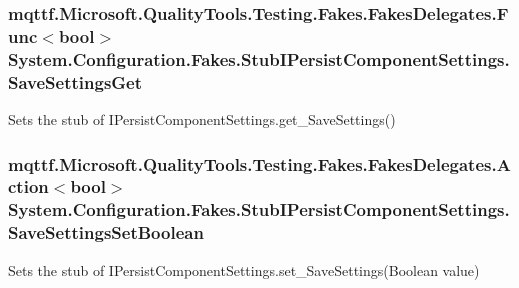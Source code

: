 \hypertarget{class_system_1_1_configuration_1_1_fakes_1_1_stub_i_persist_component_settings_ac9802a6e8e7aad73602ae13f17f6b5df}{
\subsubsection[{Save\-Settings\-Get}]{\setlength{\rightskip}{0pt plus 5cm}mqttf.\-Microsoft.\-Quality\-Tools.\-Testing.\-Fakes.\-Fakes\-Delegates.\-Func$<$bool$>$ System.\-Configuration.\-Fakes.\-Stub\-I\-Persist\-Component\-Settings.\-Save\-Settings\-Get}}\label{class_system_1_1_configuration_1_1_fakes_1_1_stub_i_persist_component_settings_ac9802a6e8e7aad73602ae13f17f6b5df}


Sets the stub of I\-Persist\-Component\-Settings.\-get\-\_\-\-Save\-Settings()

\hypertarget{class_system_1_1_configuration_1_1_fakes_1_1_stub_i_persist_component_settings_a88630acc7f683cd95c66b6fe9c04c1b9}{
\subsubsection[{Save\-Settings\-Set\-Boolean}]{\setlength{\rightskip}{0pt plus 5cm}mqttf.\-Microsoft.\-Quality\-Tools.\-Testing.\-Fakes.\-Fakes\-Delegates.\-Action$<$bool$>$ System.\-Configuration.\-Fakes.\-Stub\-I\-Persist\-Component\-Settings.\-Save\-Settings\-Set\-Boolean}}\label{class_system_1_1_configuration_1_1_fakes_1_1_stub_i_persist_component_settings_a88630acc7f683cd95c66b6fe9c04c1b9}


Sets the stub of I\-Persist\-Component\-Settings.\-set\-\_\-\-Save\-Settings(\-Boolean value)

